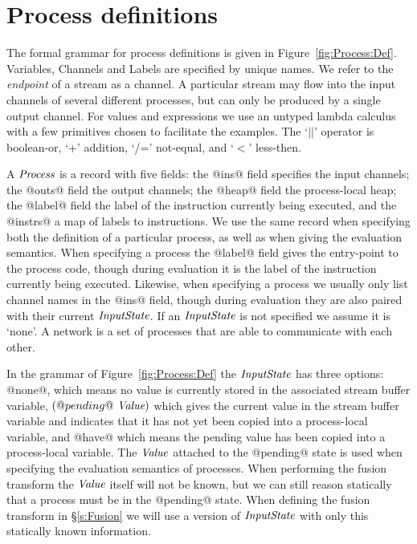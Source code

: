 
\section{Process definitions}


The formal grammar for process definitions is given in Figure~\ref{fig:Process:Def}. Variables, Channels and Labels are specified by unique names. We refer to the \emph{endpoint} of a stream as a channel. A particular stream may flow into the input channels of several different processes, but can only be produced by a single output channel. For values and expressions we use an untyped lambda calculus with a few primitives chosen to facilitate the examples. The `$||$' operator is boolean-or, `+' addition, `/=' not-equal, and `$<$' less-then.

A $\textit{Process}$ is a record with five fields: the @ins@ field specifies the input channels; the @outs@ field the output channels; the @heap@ field the process-local heap; the @label@ field the label of the instruction currently being executed, and the @instrs@ a map of labels to instructions. We use the same record when specifying both the definition of a particular process, as well as when giving the evaluation semantics. When specifying a process the @label@ field gives the entry-point to the process code, though during evaluation it is the label of the instruction currently being executed. Likewise, when specifying a process we usually only list channel names in the @ins@ field, though during evaluation they are also paired with their current $\textit{InputState}$. If an $\textit{InputState}$ is not specified we assume it is `none'. A network is a set of processes that are able to communicate with each other.

In the grammar of Figure~\ref{fig:Process:Def} the $\textit{InputState}$ has three options: @none@, which means no value is currently stored in the associated stream buffer variable, $(@pending@~\textit{Value})$ which gives the current value in the stream buffer variable and indicates that it has not yet been copied into a process-local variable, and @have@ which means the pending value has been copied into a process-local variable. The $\textit{Value}$ attached to the @pending@ state is used when specifying the evaluation semantics of processes. When performing the fusion transform the $\textit{Value}$ itself will not be known, but we can still reason statically that a process must be in the @pending@ state. When defining the fusion transform in \S\ref{s:Fusion} we will use a version of $\textit{InputState}$ with only this statically known information.

